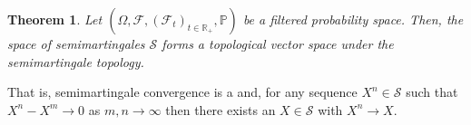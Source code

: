 \documentclass[12pt]{article}
\newtheorem*{theorem*}{Theorem}
\begin{document}

\begin{theorem*}
Let $(\Omega,\mathcal{F},(\mathcal{F}_t)_{t\in\mathbb{R}_+},\mathbb{P})$ be a filtered probability space. Then, the space of semimartingales $\mathcal{S}$ forms a  topological vector space under the semimartingale topology.
\end{theorem*}

That is, semimartingale convergence is a  and, for any sequence $X^n\in\mathcal{S}$ such that $X^n-X^m\rightarrow 0$ as $m,n\rightarrow\infty$ then there exists an $X\in\mathcal{S}$ with $X^n\rightarrow X$.

\end{document}
